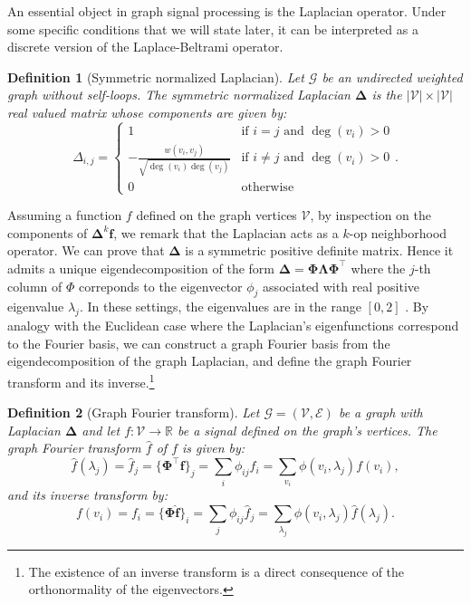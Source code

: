 \documentclass{article}
\newtheorem{definition}{Definition}[section]
\begin{document}
An essential object in graph signal processing is the Laplacian operator. Under some specific conditions that we will state later, it can be interpreted as a discrete version of the Laplace-Beltrami operator.
\begin{definition}[Symmetric normalized Laplacian] \label{def:graph_laplacian}
Let $\mathcal{G}$ be an undirected weighted graph without self-loops. The symmetric normalized Laplacian $\boldsymbol{\Delta}$ is the $|\mathcal{V}| \times |\mathcal{V}|$ real valued matrix whose components are given by:
\begin{equation}
\Delta_{i, j} =
\left\{
\begin{array}{ll}
1 & \text{if } i = j \text{ and } \deg(v_i) > 0 \\
- \frac{w(v_i, v_j)}{\sqrt{\deg (v_i) \deg (v_j)}} & \text{if } i \neq j \text{ and } \deg(v_i) > 0 \\
0 & \text{otherwise}
\end{array}
\right..
\end{equation}
\end{definition}

Assuming a function $f$ defined on the graph vertices $\mathcal{V}$, by inspection on the components of $\boldsymbol{\Delta}^k \boldsymbol{f}$, we remark that the Laplacian acts as a $k$-op neighborhood operator. We can prove that $\boldsymbol{\Delta}$ is a symmetric positive definite matrix. Hence it admits a unique eigendecomposition of the form $\boldsymbol{\Delta} = \boldsymbol{\Phi \Lambda \Phi}^\top$ where the $j$-th column of $\Phi$ correponds to the eigenvector $\phi_j$ associated with real positive eigenvalue $\lambda_j$. In these settings, the eigenvalues are in the range $[0, 2]$ \citep{chung1997spectral}. By analogy with the Euclidean case where the Laplacian's eigenfunctions correspond to the Fourier basis, we can construct a graph Fourier basis from the eigendecomposition of the graph Laplacian, and define the graph Fourier transform and its inverse.\footnote{The existence of an inverse transform is a direct consequence of the orthonormality of the eigenvectors.}
\begin{definition}[Graph Fourier transform]
Let $\mathcal{G} = (\mathcal{V}, \mathcal{E})$ be a graph with Laplacian $\boldsymbol{\Delta}$ and let $f : \mathcal{V} \to \mathbb{R}$ be a signal defined on the graph's vertices. The graph Fourier transform $\hat{f}$ of $f$ is given by:
\begin{equation}
\hat{f}(\lambda_j) = \hat{f}_j = \{ \boldsymbol{\Phi}^\top \boldsymbol{f}\}_j = \sum_i \phi_{ij} f_i = \sum_{v_i} \phi(v_i, \lambda_j) f(v_i),
\end{equation}
and its inverse transform by:
\begin{equation}
f(v_i) = f_i = \{\boldsymbol{\Phi}  \boldsymbol{\hat{f}} \}_i = \sum_j \phi_{ij} \hat{f}_j = \sum_{\lambda_j} \phi(v_i, \lambda_j) \hat{f}(\lambda_j).
\end{equation}
\end{definition}
\end{document}
